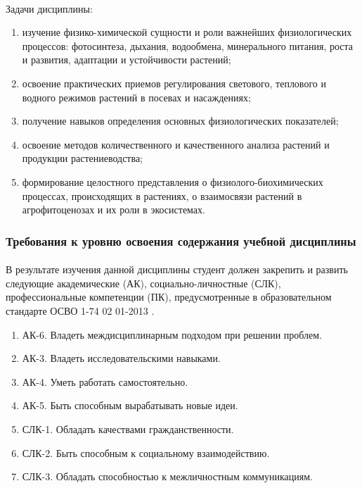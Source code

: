 \paragraph*{}Задачи дисциплины:

\begin{enumerate}

\item изучение физико-химической сущности и роли важнейших физиологических процессов: фотосинтеза, дыхания, водообмена, минерального питания, роста и развития, адаптации и устойчивости растений;
\item освоение практических приемов регулирования светового, теплового и водного режимов растений в посевах и насаждениях; 
\item получение навыков определения основных физиологических показателей; 
\item освоение методов количественного и качественного анализа растений и продукции растениеводства;
\item формирование целостного представления о физиолого-биохимических процессах, происходящих в растениях, о взаимосвязи растений в агрофитоценозах и их роли в экосистемах.

\end{enumerate}

\subsubsection{Требования к уровню освоения содержания учебной дисциплины} 

\paragraph*{}В результате изучения данной дисциплины студент должен закрепить и развить следующие академические (АК), социально-личностные (СЛК), профессиональные компетенции (ПК), предусмотренные в образовательном стандарте ОСВО 1-74 02 01-2013 .

\begin{enumerate}

\item АК-6. Владеть междисциплинарным подходом при решении проблем.
\item АК-3. Владеть исследовательскими навыками.
\item АК-4. Уметь работать самостоятельно.
\item АК-5. Быть способным вырабатывать новые идеи.
\item СЛК-1. Обладать качествами гражданственности.
\item СЛК-2. Быть способным к социальному взаимодействию.
\item СЛК-3. Обладать способностью к межличностным коммуникациям.

\end{enumerate}

